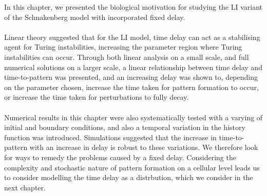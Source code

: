 In this chapter, we presented the biological motivation for studying the LI variant of the Schnakenberg model with incorporated fixed delay.
\\\\
Linear theory suggested that for the LI model, time delay can act as a stabilising agent for Turing instabilities, increasing the parameter region where Turing instabilities can occur. Through both linear analysis on a small scale, and full numerical solutions on a larger scale, a linear relationship between time delay and time-to-pattern was presented, and an increasing delay was shown to, depending on the parameter chosen, increase the time taken for pattern formation to occur, or increase the time taken for perturbations to fully decay.
\\\\
Numerical results in this chapter were also systematically tested with a varying of initial and boundary conditions, and also a temporal variation in the history function was introduced. Simulations suggested that the increase in time-to-pattern with an increase in delay is robust to these variations. We therefore look for ways to remedy the problems caused by a fixed delay. Considering the complexity and stochastic nature of pattern formation on a cellular level leads us to consider modelling the time delay as a distrbution, which we consider in the next chapter.
